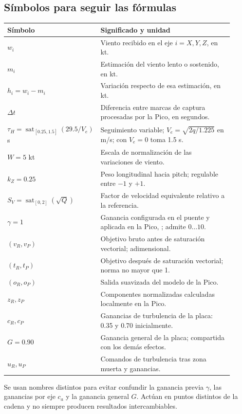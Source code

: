 \documentclass[11pt,a4paper]{article}
\newcommand{\code}[1]{\texttt{\detokenize{#1}}}
\newcommand{\sat}{\operatorname{sat}}
\begin{document}
\subsection{Símbolos para seguir las fórmulas}
\begin{longtable}{p{0.18\linewidth}p{0.74\linewidth}}
\toprule Símbolo & Significado y unidad\\\midrule\endhead
$w_i$ & Viento recibido en el eje $i=X,Y,Z$, en kt.\\
$m_i$ & Estimación del viento lento o sostenido, en kt.\\
$h_i=w_i-m_i$ & Variación respecto de esa estimación, en kt.\\
$\Delta t$ & Diferencia entre marcas de captura procesadas por la Pico, en segundos.\\
$\tau_H=\sat_{[0.25,1.5]}(29.5/V_e)$ s & Seguimiento variable; $V_e=\sqrt{2q/1.225}$ en m/s; con $V_e=0$ toma 1.5 s.\\
$W=5$ kt & Escala de normalización de las variaciones de viento.\\
$k_Z=0.25$ & Peso longitudinal hacia pitch; regulable entre $-1$ y $+1$.\\
$S_V=\sat_{[0,2]}(\sqrt Q)$ & Factor de velocidad equivalente relativo a la referencia.\\
$\gamma=1$ & Ganancia configurada en el puente y aplicada en la Pico, \code{--gust-gain}; admite $0\ldots10$.\\
$(v_R,v_P)$ & Objetivo bruto antes de saturación vectorial; adimensional.\\
$(t_R,t_P)$ & Objetivo después de saturación vectorial; norma no mayor que 1.\\
$(o_R,o_P)$ & Salida suavizada del modelo de la Pico.\\
$z_R,z_P$ & Componentes normalizadas calculadas localmente en la Pico.\\
$c_R,c_P$ & Ganancias de turbulencia de la placa: 0.35 y 0.70 inicialmente.\\
$G=0.90$ & Ganancia general de la placa; compartida con los demás efectos.\\
$u_R,u_P$ & Comandos de turbulencia tras zona muerta y ganancias.\\
\bottomrule
\end{longtable}
Se usan nombres distintos para evitar confundir la ganancia previa $\gamma$, las ganancias por eje $c_a$ y la ganancia general $G$. Actúan en puntos distintos de la cadena y no siempre producen resultados intercambiables.
\end{document}
